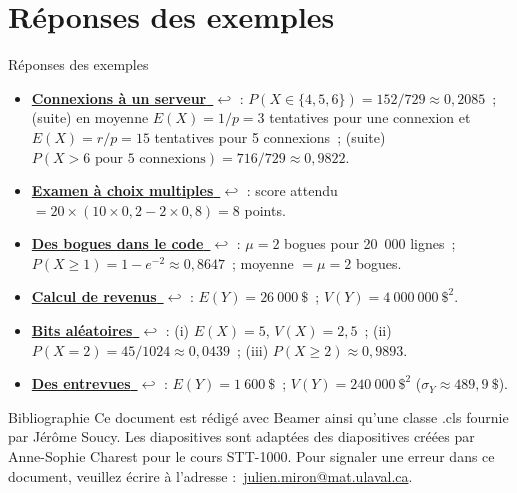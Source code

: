 \documentclass{BeamerTemplate}
\newcommand{\retour}[2]{\hyperlink{#1}{\textbf{#2}~{\color{gray}$\hookleftarrow$}}}
\begin{document}
\section{Réponses des exemples}

\begin{frame}[t,label=rep-ex]{Réponses des exemples}
\footnotesize
\begin{itemize}
\item \retour{exconn}{Connexions à un serveur} : $P(X\in\{4,5,6\})=152/729\approx0{,}2085$~;
(suite) en moyenne $E(X)=1/p=3$ tentatives pour une connexion et $E(X)=r/p=15$ tentatives pour 5 connexions~;
(suite) $P(X>6 \mbox{ pour 5 connexions})=716/729\approx0{,}9822$.
\item \retour{exexamen}{Examen à choix multiples} : score attendu $=20\times(10\times0{,}2-2\times0{,}8)=8$ points.
\item \retour{exbogues}{Des bogues dans le code} : $\mu=2$ bogues pour 20~000 lignes~;
$P(X\ge1)=1-e^{-2}\approx0{,}8647$~; moyenne $=\mu=2$ bogues.
\item \retour{exrevenus}{Calcul de revenus} : $E(Y)=26~000~\$$~; $V(Y)=4~000~000~\$^2$.
\item \retour{exbits}{Bits aléatoires} : (i) $E(X)=5$, $V(X)=2{,}5$~;
(ii) $P(X=2)=45/1024\approx0{,}0439$~; (iii) $P(X\ge2)\approx0{,}9893$.
\item \retour{exentrevues}{Des entrevues} : $E(Y)=1~600~\$$~; $V(Y)=240~000~\$^2$ ($\sigma_Y\approx489{,}9~\$$).
\end{itemize}

\end{frame}

\begin{frame}{Bibliographie}
 	Ce document est rédigé avec Beamer ainsi qu'une classe .cls fournie par Jérôme Soucy. Les diapositives sont adaptées des diapositives créées par Anne-Sophie Charest
 pour le cours STT-1000.
 	\printbibliography
 	\vfill
 	\footnotesize Pour signaler une erreur dans ce document, veuillez écrire à l'adresse :~\href{mailto:julien.miron@mat.ulaval.ca}{julien.miron@mat.ulaval.ca}.
 \end{frame}
\end{document}

